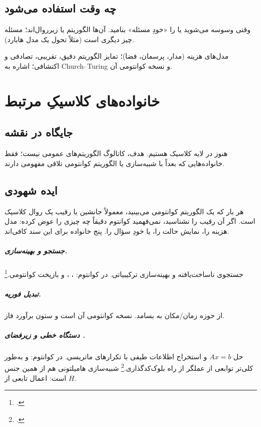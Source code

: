 \section{چه وقت استفاده می‌شود}

وقتی وسوسه می‌شوید  یا  را «خودِ مسئله» بنامید. آن‌ها الگوریتم یا زیرروال‌اند؛ مسئله چیز دیگری است (مثلاً تحول یک مدل هابارد).

\begin{remark}
مدل‌های هزینه (مدار، پرسمان، فضا)؛ تمایز الگوریتم دقیق، تقریبی، تصادفی و اکتشافی؛ اشاره به Church--Turing و نسخه کوانتومی آن.
\end{remark}

\chapter{خانواده‌های کلاسیکِ مرتبط}
\label{chap:classical}

\section{جایگاه در نقشه}

هنوز در لایه کلاسیک هستیم. هدف، کاتالوگ الگوریتم‌های عمومی نیست؛ فقط خانواده‌هایی که بعداً با شبیه‌سازی یا الگوریتم کوانتومی تلاقی مفهومی دارند.

\section{ایده شهودی}

هر بار که یک الگوریتم کوانتومی می‌بینید، معمولاً جانشین یا رقیب یک روال کلاسیک است. اگر آن رقیب را نشناسید، نمی‌فهمید کوانتوم دقیقاً چه چیزی را عوض کرده: مدل هزینه را، نمایش حالت را، یا خودِ سؤال را. پنج خانواده برای این سند کافی‌اند.

\paragraph{جستجو و بهینه‌سازی.}
جستجوی ناساخت‌یافته و بهینه‌سازی ترکیبیاتی. در کوانتوم: ، ، و بازپخت کوانتومی.\footnote{.}

\paragraph{تبدیل فوریه.}
از حوزه زمان/مکان به بسامد. نسخه کوانتومی آن  است و ستون برآورد فاز.

\paragraph{دستگاه خطی و زیرفضای .}
حل $Ax=b$ و استخراج اطلاعات طیفی با تکرارهای ماتریسی. در کوانتوم:  و به‌طور کلی‌تر توابعی از عملگر از راه بلوک‌کدگذاری.\footnote{.} شبیه‌سازی هامیلتونی هم از همین جنس است: اعمال تابعی از $H$.


